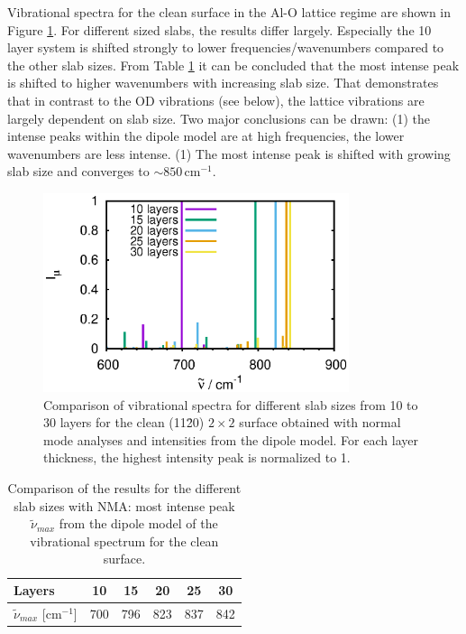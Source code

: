 \documentclass[11pt,DIV=13,BCOR=5mm,a4paper,headinclude]{scrbook}
\begin{document}
Vibrational spectra for the clean surface in the Al-O lattice regime are shown in Figure \ref{abb:clean_comp_layer}.
For different sized slabs, the results differ largely.
Especially the 10 layer system is shifted strongly to lower frequencies/wavenumbers compared to the other slab sizes.
From Table \ref{tab:comp_norm-modes_clean} it can be concluded that the most intense peak is shifted to higher wavenumbers with increasing slab size.
That demonstrates that in contrast to the OD vibrations (see below), the lattice vibrations are largely dependent on slab size.
Two major conclusions can be drawn: (1) the intense peaks within the dipole model are at high frequencies, the lower wavenumbers are less intense. (1) The most intense peak is shifted with growing slab size and converges to $\sim 850\,$cm$^{-1}$.


\begin{figure}[!h]
 \centering
 \includegraphics[width=0.8\textwidth]{figures/11-20/comp_freq_surf.eps}
 \caption{Comparison of vibrational spectra for different slab sizes from 10 to 30 layers for the clean (11\=20) $2\times 2$ surface obtained with normal mode analyses and intensities from the dipole model.
 For each layer thickness, the highest intensity peak is normalized to 1.}
 \label{abb:clean_comp_layer}
\end{figure}
\begin{table}[!h]
  \centering
 \caption{Comparison of the results for the different slab sizes with NMA: most intense peak $\tilde{\nu}_{max}$ from the dipole model of the vibrational spectrum for the clean surface.}
\vspace*{.2cm} 
  \begin{tabular}{l|ccccc}
  \toprule
Layers& 10&15&20&25&30 \\\midrule
$\tilde{\nu}_{max}$ [cm$^{-1}$] &700 &796& 823&837 & 842\\\bottomrule
  \end{tabular}
  \label{tab:comp_norm-modes_clean}
\end{table}
\end{document}
